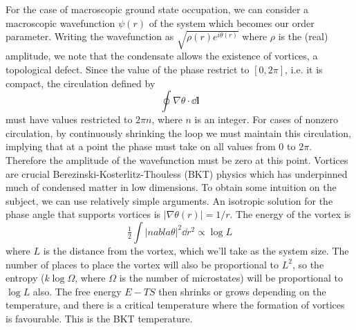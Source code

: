 \documentclass[letterpaper, 10 pt, conference]{IEEEtran}  %
\newcommand{\myvec}[1]{\boldsymbol{#1}}
\begin{document}
For the case of macroscopic ground state occupation, we can consider a macroscopic wavefunction $\psi(r)$ of the system which becomes our order parameter. 
Writing the wavefunction as $\sqrt{\rho(r) e^{i \theta (r)}}$ where $\rho$ is the (real) amplitude, we note that the condensate allows the existence of vortices, a topological defect. 
Since the value of the phase restrict to $[0, 2 \pi]$, i.e. it is compact, the circulation defined by 
\[
\oint \nabla \theta \cdot \dd{\myvec{l}} 
\]
must have values restricted to $2\pi n$, where $n$ is an integer. 
For cases of nonzero circulation, by continuously shrinking the loop we must maintain this circulation, implying that at a point the phase must take on all values from 0 to $2\pi$. 
Therefore the amplitude of the wavefunction must be zero at this point.
Vortices are crucial Berezinski-Kosterlitz-Thouless (BKT) physics which has underpinned much of condensed matter in low dimensions. 
To obtain some intuition on the subject, we can use relatively simple arguments.
An isotropic solution for the phase angle that supports vortices is $|\nabla \theta(r)| =1/r$. 
The energy of the vortex is
\[
\tfrac12 \int |nabla \theta |^2 \dd r^2 \propto \log L
\]
where $L$ is the distance from the vortex, which we'll take as the system size. 
The number of places to place the vortex will also be proportional to $L^2$, so the entropy ($k \log \Omega$, where $\Omega$ is the number of microstates) will be proportional to $\log L$ also. 
The free energy $E - TS$ then shrinks or grows depending on the temperature, and there is a critical temperature where the formation of vortices is favourable. 
This is the BKT temperature. 
\end{document}
